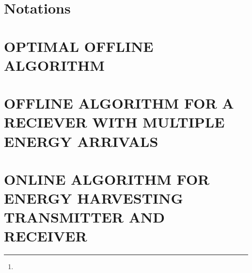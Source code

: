 \documentclass[10pt,twocolumn,twoside]{IEEEtran}
\title{}
\author{
\thanks{}
}
\begin{document}
\maketitle
\thispagestyle{empty}
\pagestyle{empty}
\begin{abstract}
\end{abstract}


\begin{IEEEkeywords}
\end{IEEEkeywords}

\section{Notations}


\section{OPTIMAL OFFLINE ALGORITHM}


\section{OFFLINE ALGORITHM FOR A RECIEVER WITH MULTIPLE ENERGY ARRIVALS}


\section{ONLINE ALGORITHM FOR ENERGY HARVESTING TRANSMITTER AND RECEIVER}


\appendices


 
\end{document}
